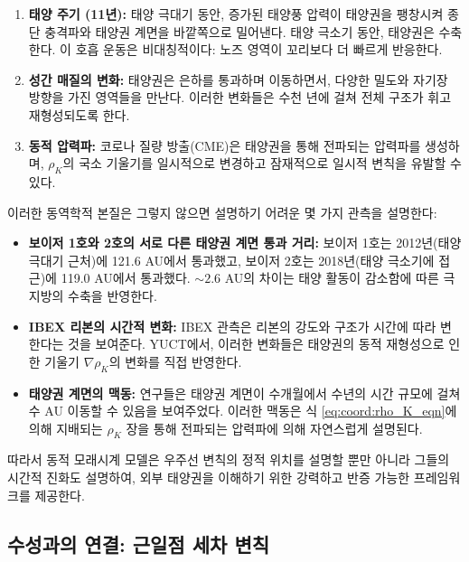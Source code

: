 \documentclass[11pt,a4paper]{article}
\theoremstyle{remark}
\begin{document}
	\begin{enumerate}
		\item \textbf{태양 주기 (11년):} 태양 극대기 동안, 증가된 태양풍 압력이 태양권을 팽창시켜 종단 충격파와 태양권 계면을 바깥쪽으로 밀어낸다. 태양 극소기 동안, 태양권은 수축한다. 이 호흡 운동은 비대칭적이다: 노즈 영역이 꼬리보다 더 빠르게 반응한다.
		
		\item \textbf{성간 매질의 변화:} 태양권은 은하를 통과하며 이동하면서, 다양한 밀도와 자기장 방향을 가진 영역들을 만난다. 이러한 변화들은 수천 년에 걸쳐 전체 구조가 휘고 재형성되도록 한다.
		
		\item \textbf{동적 압력파:} 코로나 질량 방출(CME)은 태양권을 통해 전파되는 압력파를 생성하며, $\rho_K$의 국소 기울기를 일시적으로 변경하고 잠재적으로 일시적 변칙을 유발할 수 있다.
	\end{enumerate}
	
	이러한 동역학적 본질은 그렇지 않으면 설명하기 어려운 몇 가지 관측을 설명한다:
	\begin{itemize}
		\item \textbf{보이저 1호와 2호의 서로 다른 태양권 계면 통과 거리:} 보이저 1호는 2012년(태양 극대기 근처)에 121.6 AU에서 통과했고, 보이저 2호는 2018년(태양 극소기에 접근)에 119.0 AU에서 통과했다. $\sim2.6$ AU의 차이는 태양 활동이 감소함에 따른 극지방의 수축을 반영한다.
		
		\item \textbf{IBEX 리본의 시간적 변화:} IBEX 관측은 리본의 강도와 구조가 시간에 따라 변한다는 것을 보여준다. YUCT에서, 이러한 변화들은 태양권의 동적 재형성으로 인한 기울기 $\nabla \rho_K$의 변화를 직접 반영한다.
		
		\item \textbf{태양권 계면의 맥동:} 연구들은 태양권 계면이 수개월에서 수년의 시간 규모에 걸쳐 수 AU 이동할 수 있음을 보여주었다. 이러한 맥동은 식 \eqref{eq:coord:rho_K_eqn}에 의해 지배되는 $\rho_K$ 장을 통해 전파되는 압력파에 의해 자연스럽게 설명된다.
	\end{itemize}
	
	따라서 동적 모래시계 모델은 우주선 변칙의 정적 위치를 설명할 뿐만 아니라 그들의 시간적 진화도 설명하여, 외부 태양권을 이해하기 위한 강력하고 반증 가능한 프레임워크를 제공한다.
	
	\subsection{수성과의 연결: 근일점 세차 변칙}
	\label{subsec:coord:mercury}
	
\end{document}
